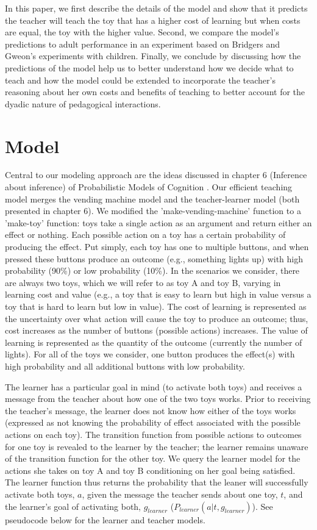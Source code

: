 \documentclass[10pt,letterpaper]{article}
\begin{document}
In this paper, we first describe the details of the model and show that it predicts the teacher will teach the toy that has a higher cost of learning but when costs are equal, the toy with the higher value. Second, we compare the model's predictions to adult performance in an experiment based on Bridgers and Gweon's experiments with children. Finally, we conclude by discussing how the predictions of the model help us to better understand how we decide what to teach and how the model could be extended to incorporate the teacher's reasoning about her own costs and benefits of teaching to better account for the dyadic nature of pedagogical interactions.

\section{Model}

Central to our modeling approach are the ideas discussed in chapter 6 (Inference about inference) of Probabilistic Models of Cognition \cite{Goodman}. Our efficient teaching model merges the vending machine model and the teacher-learner model (both presented in chapter 6).  We modified the 'make-vending-machine' function to a 'make-toy' function: toys take a single action as an argument and return either an effect or nothing. Each possible action on a toy has a certain probability of producing the effect. Put simply, each toy has one to multiple buttons, and when pressed these buttons produce an outcome (e.g., something lights up) with high probability (90\%) or low probability (10\%). In the scenarios we consider, there are always two toys, which we will refer to as toy A and toy B, varying in learning cost and value (e.g., a toy that is easy to learn but high in value versus a toy that is hard to learn but low in value). The cost of learning is represented as the uncertainty over what action will cause the toy to produce an outcome; thus, cost increases as the number of buttons (possible actions) increases. The value of learning is represented as the quantity of the outcome (currently the number of lights). For all of the toys we consider, one button produces the effect(s) with high probability and all additional buttons with low probability. 

The learner has a particular goal in mind (to activate both toys) and receives a message from the teacher about how one of the two toys works. Prior to receiving the teacher's message, the learner does not know how either of the toys works (expressed as not knowing the probability of effect associated with the possible actions on each toy). The transition function from possible actions to outcomes for one toy is revealed to the learner by the teacher; the learner remains unaware of the transition function for the other toy. We query the learner model for the actions she takes on toy A and toy B conditioning on her goal being satisfied. The learner function thus returns the probability that the leaner will successfully activate both toys, $a$, given the message the teacher sends about one toy, $t$, and the learner's goal of activating both, $g_{learner}$ ($P_{learner}(a | t, g_{learner})$). See pseudocode below for the learner and teacher models.
\end{document}
